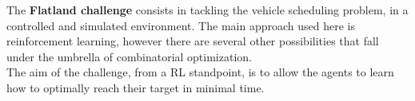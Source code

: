 The \textbf{Flatland challenge} consists in tackling the vehicle scheduling problem, in a controlled and simulated environment. The main approach used here is reinforcement learning, however there are several other possibilities that fall under the umbrella of combinatorial optimization.\\
The aim of the challenge, from a RL standpoint, is to allow the agents to learn how to optimally reach their target in minimal time.